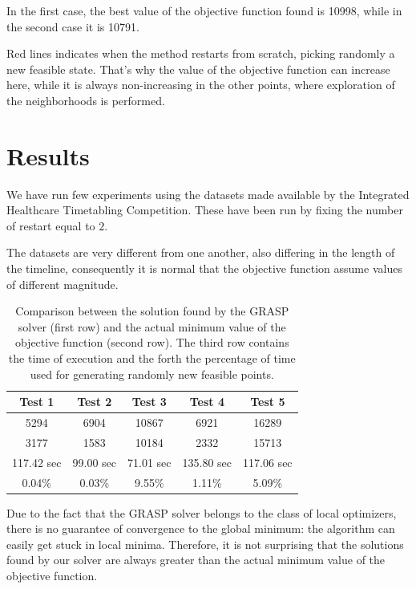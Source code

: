 \documentclass{article}
\begin{document}
In the first case, the best value of the objective function found is 10998, while in the second case it is 10791.

Red lines indicates when the method restarts from scratch, picking randomly a new feasible state. That's why the 
value of the objective function can increase here, while it is always non-increasing in the other points, where exploration of the 
neighborhoods is performed.

\section{Results}
We have run few experiments using the datasets made available by the Integrated Healthcare Timetabling Competition. 
These have been run by fixing the number of restart equal to $2$.

The datasets are very different from one another, also differing in the length of the timeline, consequently it is normal that the objective function assume values of different magnitude.

\begin{table}[h!]
    \centering
    \begin{tabular}{|c|c|c|c|c|}
        \hline
        \textbf{Test 1} & \textbf{Test 2} & \textbf{Test 3} & \textbf{Test 4} & \textbf{Test 5}  \\ \hline
        5294 & 6904 & 10867 & 6921 & 16289   \\ \hline
        3177 & 1583 & 10184 & 2332 & 15713  \\ \hline
        117.42 sec & 99.00 sec & 71.01 sec & 135.80 sec & 117.06 sec \\ \hline
        0.04\% & 0.03\% & 9.55\% & 1.11\% & 5.09\% \\ \hline
    \end{tabular}
    \caption{Comparison between the solution found by the GRASP solver (first row) and the actual minimum value of the objective function (second row). The third row contains the time of execution and the forth the percentage of time used for generating randomly new feasible points.}
    \label{table:risultati}
\end{table}

Due to the fact that the GRASP solver belongs to the class of local optimizers, there is no guarantee of convergence to the global minimum: the algorithm can easily get stuck in local minima. Therefore, it is not surprising that the solutions found by our solver are always greater than the actual minimum value of the objective function.
\end{document}
